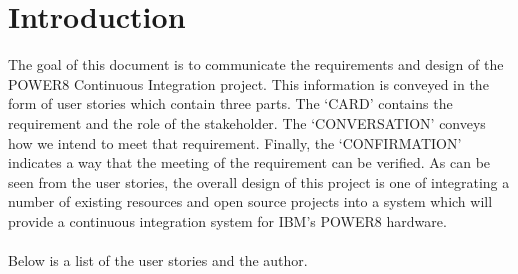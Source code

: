 \documentclass[10pt,letterpaper,onecolumn,journal]{IEEEtran}
\begin{document}
\section{Introduction}
The goal of this document is to communicate the requirements and design of the POWER8 Continuous Integration project.
This information is conveyed in the form of user stories which contain three parts.
The `CARD' contains the requirement and the role of the stakeholder.
The `CONVERSATION' conveys how we intend to meet that requirement.
Finally, the `CONFIRMATION' indicates a way that the meeting of the requirement can be verified.
As can be seen from the user stories, the overall design of this project is one of integrating a number of existing resources and open source projects into a system which will provide a continuous integration system for IBM's POWER8 hardware.\\\\
Below is a list of the user stories and the author.\\
\end{document}
